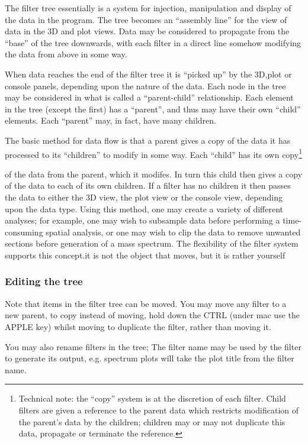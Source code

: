 \documentclass[10pt]{article}
\begin{document}
The filter tree essentially is a system for injection, manipulation and display of the data in the program. The tree becomes an ``assembly line'' for the view of data in the 3D and plot views. Data may be considered to propagate from the ``base'' of the tree downwards, with each filter in a direct line somehow modifying the data from above in some way.  

When data reaches the end of the filter tree it is ``picked up'' by the 3D,plot or console panels, depending upon the nature of the data. Each node in the tree may be considered in what is called a ``parent-child'' relationship. Each element in the tree (except the first) has a ``parent'', and thus may have their own ``child'' elements. Each ``parent'' may, in fact, have many children.  

The basic method for data flow is that a parent gives a copy of the data it has processed to its ``children'' to modify in some way. Each ``child'' has its own copy\footnote{Technical note: the ``copy'' system is at the discretion of each filter. Child filters are given a reference to the parent data which restricts modification of the parent's data by the children; children may or may not duplicate this data, propagate or terminate the reference.}{of the data from the parent, which it modifes. In turn this child then gives a copy of the data to each of its own children. If a filter has no children it then passes the data to either the 3D view, the plot view or the console view, depending upon the data type.  
 Using this method, one may create a variety of different analyses; for example, one may wish to subsample data before performing a time-consuming spatial analysis, or one may wish to clip the data to remove unwanted sections before generation of a mass spectrum. The flexibility of the filter system supports this concept.it is not the object that moves, but it is rather yourself  

\subsubsection{Editing the tree}

Note that items in the filter tree can be moved. You may move any filter to a new parent, to copy instead of moving, hold down the CTRL (under mac use the APPLE key) whilst moving to duplicate the filter, rather than moving it.  

You may also rename filters in the tree; The filter name may be used by the filter to generate its output, e.g. spectrum plots will take the plot title from the filter name. 


}
\end{document}
